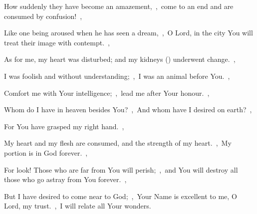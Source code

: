 \documentclass[12pt,twoside,a5paper]{article}
\begin{document}
\begin{normalparskip}
  How suddenly they have become an amazement,~\sep\ come to an end and are consumed by confusion!~\sep

  Like one being aroused when he has seen a dream,~\sep\ O Lord, in the city You will treat their image with contempt.~\sep

  As for me, my heart was disturbed; and my kidneys () underwent change.~\sep

  I was foolish and without understanding;~\sep\ I was an animal before You.~\sep

  Comfort me with Your intelligence;~\sep\ lead me after Your honour.~\sep

  Whom do I have in heaven besides You?~\sep\ And whom have I desired on earth?~\sep

  For You have grasped my right hand.~\sep

  My heart and my flesh are consumed, and the strength of my heart.~\sep\ My portion is in God forever.~\sep

  For look! Those who are far from You will perish;~\sep\ and You will destroy all those who go astray from You forever.~\sep

  But I have desired to come near to God;~\sep\ Your Name is excellent to me, O Lord, my trust.~\sep\ I will relate all Your wonders.
\end{normalparskip}

\end{document}
